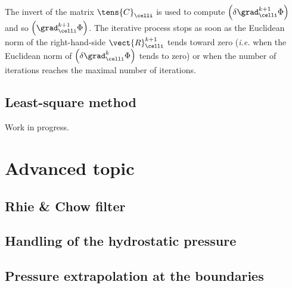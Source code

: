 The invert of the matrix $\tens{C}_{\celli}$ is used to compute $\left( \delta \grad_\celli^{k+1} \Phi \right)$ 
and so $\left( \grad^{k+1}_{\celli} \Phi \right)$. The iterative process stops as soon as the Euclidean norm of the right-hand-side $\vect{R}^{k+1}_{\celli}$ tends toward zero (\emph{i.e.} when the Euclidean norm
of $\left( \delta \grad^{k}_{\celli} \Phi \right)$ tends to zero) or when the number of iterations reaches the maximal number of iterations.




\subsection{Least-square method}
Work in progress.


\section{Advanced topic}

\subsection{Rhie \& Chow filter}


\subsection{Handling of the hydrostatic pressure}

\subsection{Pressure extrapolation at the boundaries}


